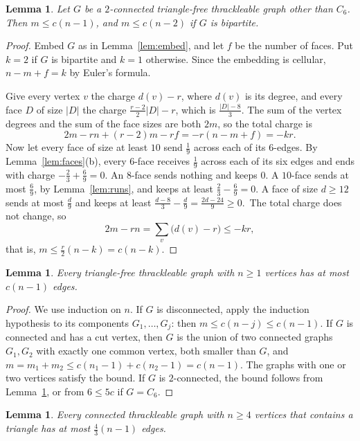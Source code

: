 \documentclass[11pt]{amsart}
\newtheorem{lemma}[theorem]{Lemma}
\theoremstyle{definition}
\theoremstyle{remark}
\numberwithin{equation}{section}
\newcommand{\cc}{\frac43}\newcommand{\ccs}{4/3}\newcommand{\ccdec}{1.3333\ldots}
\begin{document}
\begin{lemma}\label{lem:twoconn}
Let $G$ be a $2$-connected triangle-free thrackleable graph other than $C_6$. Then $m\le c(n-1)$, and $m\le c(n-2)$ if $G$ is bipartite.
\end{lemma}

\begin{proof}
Embed $G$ as in Lemma~\ref{lem:embed}, and let $f$ be the number of faces. Put $k=2$ if $G$ is bipartite and $k=1$ otherwise. Since the embedding is cellular, $n-m+f=k$ by Euler's formula.

Give every vertex $v$ the charge $d(v)-r$, where $d(v)$ is its degree, and every face $D$ of size $|D|$ the charge $\frac{r-2}2|D|-r$, which is $\frac{|D|-8}{3}$. The sum of the vertex degrees and the sum of the face sizes are both $2m$, so the total charge is
\[
2m-rn+(r-2)m-rf=-r(n-m+f)=-kr.
\]
Now let every face of size at least $10$ send $\frac19$ across each of its $6$-edges. By Lemma~\ref{lem:faces}(b), every $6$-face receives $\frac19$ across each of its six edges and ends with charge $-\frac23+\frac69=0$. An $8$-face sends nothing and keeps $0$. A $10$-face sends at most $\frac69$, by Lemma~\ref{lem:runs}, and keeps at least $\frac23-\frac69=0$. A face of size $d\ge12$ sends at most $\frac d9$ and keeps at least $\frac{d-8}3-\frac d9=\frac{2d-24}9\ge0$.\ The total charge does not change, so
\[
2m-rn=\sum_v\bigl(d(v)-r\bigr)\le-kr,
\]
that is, $m\le\frac r2(n-k)=c(n-k)$.
\end{proof}

\begin{lemma}\label{lem:trianglefree}
Every triangle-free thrackleable graph with $n\ge1$ vertices has at most $c(n-1)$ edges.
\end{lemma}

\begin{proof}
We use induction on $n$. If $G$ is disconnected, apply the induction hypothesis to its components $G_1,\dots,G_j$: then $m\le c(n-j)\le c(n-1)$. If $G$ is connected and has a cut vertex, then $G$ is the union of two connected graphs $G_1,G_2$ with exactly one common vertex, both smaller than $G$, and $m=m_1+m_2\le c(n_1-1)+c(n_2-1)=c(n-1)$. The graphs with one or two vertices satisfy the bound. If $G$ is $2$-connected, the bound follows from Lemma~\ref{lem:twoconn}, or from $6\le5c$ if $G=C_6$.
\end{proof}

\begin{lemma}\label{lem:triangle}
Every connected thrackleable graph with $n\ge4$ vertices that contains a triangle has at most $\cc(n-1)$ edges.
\end{lemma}
\end{document}

